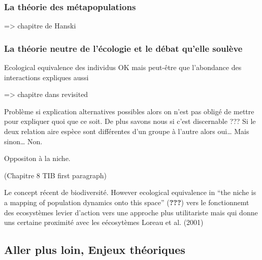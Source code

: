 \subsubsection{La théorie des
métapopulations}\label{la-thuxe9orie-des-muxe9tapopulations}

=\textgreater{} chapitre de Hanski

\subsubsection{La théorie neutre de l'écologie et le débat qu'elle
soulève}\label{la-thuxe9orie-neutre-de-luxe9cologie-et-le-duxe9bat-quelle-souluxe8ve}

Ecological equivalence des individus OK mais peut-être que l'abondance
des interactions expliques aussi

=\textgreater{} chapitre dans revisited

Problème si explication alternatives possibles alors on n'est pas obligé
de mettre pour expliquer quoi que ce soit. De plus savons nous si c'est
discernable ??? Si le deux relation aire espèce sont différentes d'un
groupe à l'autre alors oui\ldots{} Mais sinon\ldots{} Non.

Oppositon à la niche.

(Chapitre 8 TIB first paragraph)

Le concept récent de biodiversité. However ecological equivalence in
``the niche is a mapping of population dynamics onto this space''
({\textbf{???}}) vers le fonctionnemt des ecosystèmes levier d'action
vers une approche plus utilitariste mais qui donne uns certaine
proximité avec les eécosytèmes Loreau et al. (2001)

\subsection{Aller plus loin, Enjeux
théoriques}\label{aller-plus-loin-enjeux-thuxe9oriques}

